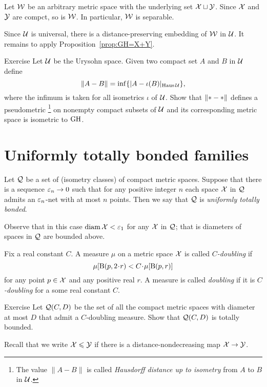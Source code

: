 Let $\mathcal{W}$ be an arbitrary metric space with the underlying set $\mathcal{X}\sqcup \mathcal{Y}$.
Since $\mathcal{X}$ and $\mathcal{Y}$ are compct, so is $\mathcal{W}$.
In particular, $\mathcal{W}$ is separable.

Since $\mathcal{U}$ is universal, there is a distance-preserving embedding of $\mathcal{W}$ in $\mathcal{U}$.
It remains to apply Proposition~\ref{prop:GH=X+Y}.
\qeds

\begin{thm}{Exercise}
Let $\mathcal{U}$ be the Urysohn space.
Given two compact set $A$ and $B$ in $\mathcal{U}$ define 
\[\|A-B\|=\inf\{|A-\iota(B)|_{\operatorname{\rm Haus}\nolimits\mathcal{U}}\},\]
where the infimum is taken for all isometrics $\iota$ of $\mathcal{U}$.
Show that $\|{*}\z-{*}\|$ defines a pseudometric%
\footnote{The value $\|A-B\|$ is called \emph{Hausdorff distance up to isometry} from $A$ to $B$ in $\mathcal{U}$.}
on nonempty compact subsets of $\mathcal{U}$ and its corresponding metric space is isometric to $\operatorname{\rm GH}\nolimits$.
\end{thm}
\section{Uniformly totally bonded families}

Let $\mathcal{Q}$ be a set of (isometry classes) of compact metric spaces.
Suppose that there is a sequence $\varepsilon_n\to 0$ such that for any positive integer $n$ each space $\mathcal{X}$ in $\mathcal{Q}$ admits an $\varepsilon_n$-net with at most $n$ points.
Then we say that $\mathcal{Q}$ is \emph{uniformly totally bonded}.

Observe that in this case $\operatorname{\rm diam}\nolimits\mathcal{X}<\varepsilon_1$ for any  $\mathcal{X}$ in $\mathcal{Q}$; that is diameters of spaces in $\mathcal{Q}$ are bounded above.

Fix a real constant $C$.
A measure $\mu$ on a metric space $\mathcal{X}$ is called \emph{$C$-doubling} if
\[\mu[\oBall(p,2\cdot r)< C\cdot\mu[\oBall(p,r)]\]
for any point $p\in \mathcal{X}$ and any positive real $r$.
A measure is called \emph{doubling} if it is {}\emph{$C$-doubling} for a some real constant $C$.

\begin{thm}{Exercise}\label{pr:doubling}
Let $\mathcal{Q}(C,D)$ be the set of all the compact metric spaces with diameter at most $D$ that admit a $C$-doubling measure.
Show that $\mathcal{Q}(C,D)$ is totally bounded.
\end{thm}

Recall that we write $\mathcal{X}\leqslant\mathcal{Y}$ if there is a distance-nondecreasing map $\mathcal{X}\to\mathcal{Y}$.

